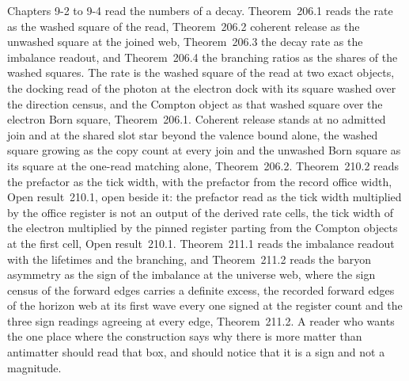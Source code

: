 Chapters 9-2 to 9-4 read the numbers of a decay. Theorem~206.1 reads the rate as the washed square of the read, Theorem~206.2 coherent release as the unwashed square at the joined web, Theorem~206.3 the decay rate as the imbalance readout, and Theorem~206.4 the branching ratios as the shares of the washed squares. The rate is the washed square of the read at two exact objects, the docking read of the photon at the electron dock with its square washed over the direction census, and the Compton object as that washed square over the electron Born square, Theorem~206.1. Coherent release stands at no admitted join and at the shared slot star beyond the valence bound alone, the washed square growing as the copy count at every join and the unwashed Born square as its square at the one-read matching alone, Theorem~206.2. Theorem~210.2 reads the prefactor as the tick width, with the prefactor from the record office width, Open result~210.1, open beside it: the prefactor read as the tick width multiplied by the office register is not an output of the derived rate cells, the tick width of the electron multiplied by the pinned register parting from the Compton objects at the first cell, Open result~210.1. Theorem~211.1 reads the imbalance readout with the lifetimes and the branching, and Theorem~211.2 reads the baryon asymmetry as the sign of the imbalance at the universe web, where the sign census of the forward edges carries a definite excess, the recorded forward edges of the horizon web at its first wave every one signed at the register count and the three sign readings agreeing at every edge, Theorem~211.2. A reader who wants the one place where the construction says why there is more matter than antimatter should read that box, and should notice that it is a sign and not a magnitude.

